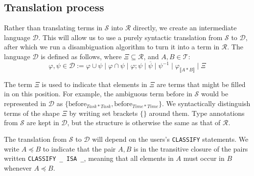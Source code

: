 \documentclass[12pt]{article}
\newcommand{\typetyped}[2]{{#1}_{\llbracket #2 \rrbracket}}
\newcommand{\conv}[1]{{#1}^{-1}}
\begin{document}
\subsection{Translation process}
Rather than translating terms in $\mathcal{S}$ into $\mathcal{R}$ directly, we create an intermediate language $\mathcal{D}$.
This will allow us to use a purely syntactic translation from $\mathcal{S}$ to $\mathcal{D}$, after which we run a disambiguation algorithm to turn it into a term in $\mathcal{R}$.
The language $\mathcal{D}$ is defined as follows, where $\Xi \subseteq \mathcal{R}$, and $A,B\in\mathcal{T}$:
\[
\varphi,\psi\in\mathcal{D} \mathbin{:=} \varphi \cup \psi \mid \varphi \cap \psi \mid \varphi ; \psi \mid \overline{\psi}\mid \conv{\psi} \mid \typetyped{\varphi}{A*B} \mid \Xi
\]

The term $\Xi$ is used to indicate that elements in $\Xi$ are terms that might be filled in on this position.
For example, the ambiguous term $\mathrm{before}$ in $\mathcal{S}$ would be represented in $\mathcal{D}$ as $\{\mathrm{before}_{Task*Task},\mathrm{before}_{Time*Time}\}$.
We syntactically distinguish terms of the shape $\Xi$ by writing set brackets $\{\}$ around them.
Type annotations from $\mathcal{S}$ are kept in $\mathcal{D}$, but the structure is otherwise the same as that of $\mathcal{R}$.

The translation from $\mathcal{S}$ to $\mathcal{D}$ will depend on the users's \verb=CLASSIFY= statements.
We write $A\preceq B$ to indicate that the pair $A,B$ is in the transitive closure of the pairs written \verb=CLASSIFY _ ISA _=, meaning that all elements in $A$ must occur in $B$ whenever $A\preceq B$.
\end{document}
